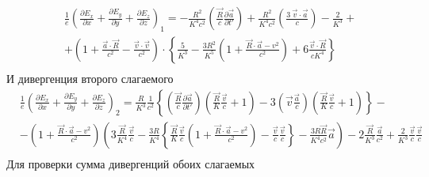 \documentclass[11pt]{article}
\begin{document}
\[\begin{align}
  & \frac{1}{e}{{\left( \frac{\partial {{E}_{x}}}{\partial x}+\frac{\partial {{E}_{y}}}{\partial y}+\frac{\partial {{E}_{z}}}{\partial z} \right)}_{1}}=-\frac{{{R}^{2}}}{{{K}^{4}}{{c}^{2}}}\left( \frac{\overrightarrow{R}}{c}\frac{\partial \overrightarrow{a}}{\partial t'} \right)+\frac{{{R}^{2}}}{{{K}^{4}}{{c}^{2}}}\left( \frac{3\ \overrightarrow{v}\cdot \overrightarrow{a}}{c} \right)-\frac{2}{{{K}^{3}}}+ \\ 
 & +\left( 1+\frac{\overrightarrow{a}\cdot \overrightarrow{R}}{{{c}^{2}}}-\frac{\overrightarrow{v}\cdot \overrightarrow{v}}{{{c}^{2}}} \right)\cdot \left\{ \frac{5}{{{K}^{3}}}-\frac{3{{R}^{2}}}{{{K}^{5}}}\left( 1+\frac{\overrightarrow{R}\cdot \overrightarrow{a}-{{v}^{2}}}{{{c}^{2}}} \right)+6\frac{\overrightarrow{v}\cdot \overrightarrow{R}}{c{{K}^{4}}} \right\} \\ 
\end{align}\] И дивергенция второго слагаемого \[\begin{align}
  & \frac{1}{e}{{\left( \frac{\partial {{E}_{x}}}{\partial x}+\frac{\partial {{E}_{y}}}{\partial y}+\frac{\partial {{E}_{z}}}{\partial z} \right)}_{2}}=\frac{R}{{{K}^{3}}}\frac{1}{{{c}^{2}}}\left\{ \left( \frac{\overrightarrow{R}}{c}\frac{\partial \overrightarrow{a}}{\partial t'} \right)\left( \frac{\overrightarrow{R}}{K}\frac{\overrightarrow{v}}{c}+1 \right)-3\left( \overrightarrow{v}\frac{\overrightarrow{a}}{c} \right)\left( \frac{\overrightarrow{R}}{K}\frac{\overrightarrow{v}}{c}+1 \right) \right\}- \\ 
 & -\left( 1+\frac{\overrightarrow{R}\cdot \overrightarrow{a}-{{v}^{2}}}{{{c}^{2}}} \right)\left( 3\frac{\overrightarrow{R}}{{{K}^{4}}}\frac{\overrightarrow{v}}{c}-\frac{3R}{{{K}^{4}}}\left\{ \frac{\overrightarrow{R}}{K}\frac{\overrightarrow{v}}{c}\left( 1+\frac{\overrightarrow{R}\cdot \overrightarrow{a}-{{v}^{2}}}{{{c}^{2}}} \right)-\frac{\overrightarrow{v}}{c}\frac{\overrightarrow{v}}{c} \right\}-\frac{3R\overrightarrow{R}}{{{K}^{4}}{{c}^{2}}}\overrightarrow{a} \right)-2\frac{\overrightarrow{R}}{{{K}^{3}}}\frac{\overrightarrow{a}}{{{c}^{2}}}+\frac{2}{{{K}^{3}}}\frac{\overrightarrow{v}}{c}\frac{\overrightarrow{v}}{c} \\ 
\end{align}\] Для проверки сумма дивергенций обоих слагаемых
\end{document}
